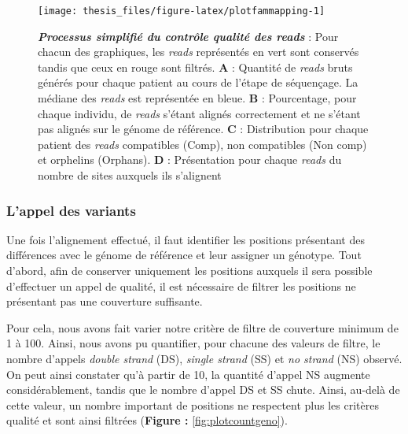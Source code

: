 \documentclass[12pt,a4paper,twoside]{ugathesis}
\theoremstyle{definition}
\theoremstyle{definition}
\theoremstyle{definition}
\theoremstyle{remark}
\begin{document}
\begin{figure}

{\centering \texttt{[image: thesis\_files/figure-latex/plotfammapping-1]} 

}

\caption[Processus simplifié du contrôle qualité des
\emph{reads}\\]{\textbf{\emph{Processus simplifié du contrôle
qualité des \emph{reads}}} : Pour chacun des graphiques, les
\emph{reads} représentés en vert sont conservés tandis que ceux en rouge
sont filtrés. \textbf{A} : Quantité de \emph{reads} bruts générés pour
chaque patient au cours de l'étape de séquençage. La médiane des
\emph{reads} est représentée en bleue. \textbf{B} : Pourcentage, pour
chaque individu, de \emph{reads} s'étant alignés correctement et ne
s'étant pas alignés sur le génome de référence. \textbf{C} :
Distribution pour chaque patient des \emph{reads} compatibles (Comp),
non compatibles (Non comp) et orphelins (Orphans). \textbf{D} :
Présentation pour chaque \emph{reads} du nombre de sites auxquels ils
s'alignent}\label{fig:plotfammapping}
\end{figure}
















\newpage

\subsubsection{L'appel des variants}\label{lappel-des-variants-1}

Une fois l'alignement effectué, il faut identifier les positions
présentant des différences avec le génome de référence et leur assigner
un génotype. Tout d'abord, afin de conserver uniquement les positions
auxquels il sera possible d'effectuer un appel de qualité, il est
nécessaire de filtrer les positions ne présentant pas une couverture
suffisante.

Pour cela, nous avons fait varier notre critère de filtre de couverture
minimum de 1 à 100. Ainsi, nous avons pu quantifier, pour chacune des
valeurs de filtre, le nombre d'appels \emph{double strand} (DS),
\emph{single strand} (SS) et \emph{no strand} (NS) observé. On peut
ainsi constater qu'à partir de 10, la quantité d'appel NS augmente
considérablement, tandis que le nombre d'appel DS et SS chute. Ainsi,
au-delà de cette valeur, un nombre important de positions ne respectent
plus les critères qualité et sont ainsi filtrées (\textbf{Figure :
}\ref{fig:plotcountgeno}).\\
\end{document}
